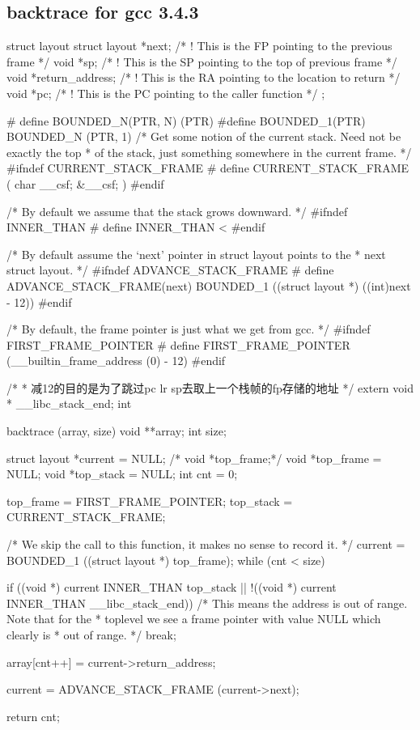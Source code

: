 \subsection{backtrace for gcc 3.4.3}
\begin{code}
struct layout
{
    struct layout *next;        /* ! This is the FP pointing to the previous frame           */
    void *sp;                   /* ! This is the SP pointing to the top of previous frame    */
    void *return_address;       /* ! This is the RA pointing to the location to return       */
    void *pc;                   /* ! This is the PC pointing to the caller function          */
};


# define BOUNDED_N(PTR, N) (PTR)
#define BOUNDED_1(PTR) BOUNDED_N (PTR, 1)
/*  Get some notion of the current stack.  Need not be exactly the top
 *     of the stack, just something somewhere in the current frame.  */
#ifndef CURRENT_STACK_FRAME
# define CURRENT_STACK_FRAME  ({ char __csf; &__csf; })
#endif

/*  By default we assume that the stack grows downward.  */
#ifndef INNER_THAN
# define INNER_THAN <
#endif

/*  By default assume the `next' pointer in struct layout points to the
 *     next struct layout.  */
#ifndef ADVANCE_STACK_FRAME
# define ADVANCE_STACK_FRAME(next) BOUNDED_1 ((struct layout *) ((int)next - 12))
#endif

/*  By default, the frame pointer is just what we get from gcc.  */
#ifndef FIRST_FRAME_POINTER
# define FIRST_FRAME_POINTER  (__builtin_frame_address (0) - 12)
#endif

/*
 * 减12的目的是为了跳过pc lr sp去取上一个栈帧的fp存储的地址
 */
extern void * __libc_stack_end;
    int
\end{code}
\begin{code}
backtrace (array, size)
    void **array;
    int size;
{
    struct layout *current = NULL;
    /* void *top_frame;*/
    void *top_frame = NULL;
    void *top_stack = NULL;
    int cnt = 0;

    top_frame = FIRST_FRAME_POINTER;
    top_stack = CURRENT_STACK_FRAME;

    /*  We skip the call to this function, it makes no sense to record it.  */
    current = BOUNDED_1 ((struct layout *) top_frame);
    while (cnt < size)
    {
        if ((void *) current INNER_THAN top_stack
                || !((void *) current INNER_THAN __libc_stack_end))
            /*  This means the address is out of range.  Note that for the
             *  toplevel we see a frame pointer with value NULL which clearly is
             *  out of range.  */
            break;

        array[cnt++] = current->return_address;

        current = ADVANCE_STACK_FRAME (current->next);
    }

    return cnt;
}
\end{code}

